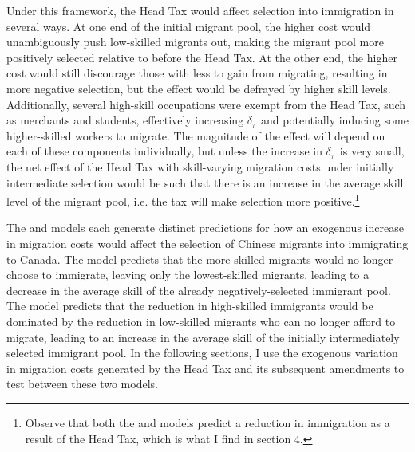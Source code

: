 Under this framework, the Head Tax would affect selection into immigration in several ways. At one end of the initial migrant pool, the higher cost would unambiguously push low-skilled migrants out, making the migrant pool more positively selected relative to before the Head Tax. At the other end, the higher cost would still discourage those with less to gain from migrating, resulting in more negative selection, but the effect would be defrayed by higher skill levels. Additionally, several high-skill occupations were exempt from the Head Tax, such as merchants and students, effectively increasing $\delta_{\pi}$ and potentially inducing some higher-skilled workers to migrate. 
The magnitude of the effect will depend on each of these components individually, but unless the increase in $\delta_{\pi}$ is very small, the net effect of the Head Tax with skill-varying migration costs under initially intermediate selection would be such that there is an increase in the average skill level of the migrant pool, i.e. the tax will make selection more positive.\footnote{Observe that both the \citet{borjas1987} and \citet{chiquiarhanson2005} models predict a reduction in immigration as a result of the Head Tax, which is what I find in section 4.}

The \citet{borjas1987} and \citet{chiquiarhanson2005} models each generate distinct predictions for how an exogenous increase in migration costs would affect the selection of Chinese migrants into immigrating to Canada. The \citet{borjas1987} model predicts that the more skilled migrants would no longer choose to immigrate, leaving only the lowest-skilled migrants, leading to a decrease in the average skill of the already negatively-selected immigrant pool. The \citet{chiquiarhanson2005} model predicts that the reduction in high-skilled immigrants would be dominated by the reduction in low-skilled migrants who can no longer afford to migrate, leading to an increase in the average skill of the initially intermediately selected immigrant pool. In the following sections, I use the exogenous variation in migration costs generated by the Head Tax and its subsequent amendments to test between these two models.

